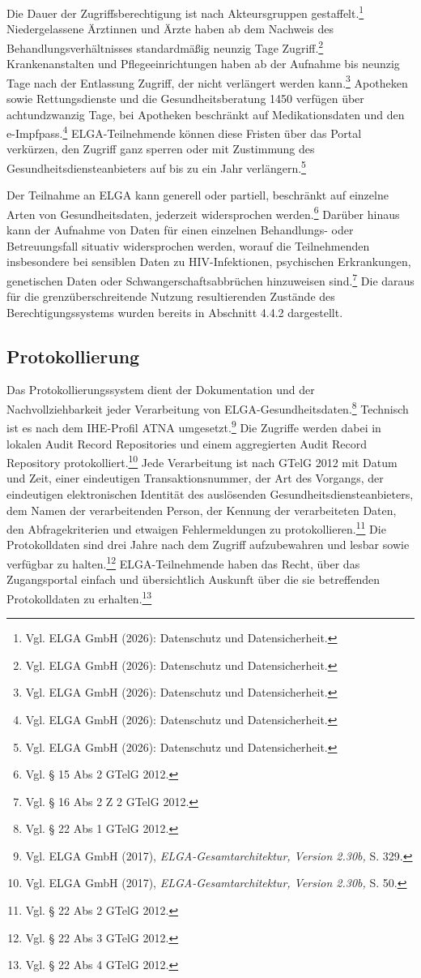 Die Dauer der Zugriffsberechtigung ist nach Akteursgruppen gestaffelt.\footnote{Vgl. ELGA GmbH (2026): Datenschutz und Datensicherheit.} Niedergelassene Ärztinnen und Ärzte haben ab dem Nachweis des Behandlungsverhältnisses standardmäßig neunzig Tage Zugriff.\footnote{Vgl. ELGA GmbH (2026): Datenschutz und Datensicherheit.} Krankenanstalten und Pflegeeinrichtungen haben ab der Aufnahme bis neunzig Tage nach der Entlassung Zugriff, der nicht verlängert werden kann.\footnote{Vgl. ELGA GmbH (2026): Datenschutz und Datensicherheit.} Apotheken sowie Rettungsdienste und die Gesundheitsberatung 1450 verfügen über achtundzwanzig Tage, bei Apotheken beschränkt auf Medikationsdaten und den e-Impfpass.\footnote{Vgl. ELGA GmbH (2026): Datenschutz und Datensicherheit.} ELGA-Teilnehmende können diese Fristen über das Portal verkürzen, den Zugriff ganz sperren oder mit Zustimmung des Gesundheitsdiensteanbieters auf bis zu ein Jahr verlängern.\footnote{Vgl. ELGA GmbH (2026): Datenschutz und Datensicherheit.}

Der Teilnahme an ELGA kann generell oder partiell, beschränkt auf einzelne Arten von Gesundheitsdaten, jederzeit widersprochen werden.\footnote{Vgl. § 15 Abs 2 GTelG 2012.} Darüber hinaus kann der Aufnahme von Daten für einen einzelnen Behandlungs- oder Betreuungsfall situativ widersprochen werden, worauf die Teilnehmenden insbesondere bei sensiblen Daten zu HIV-Infektionen, psychischen Erkrankungen, genetischen Daten oder Schwangerschaftsabbrüchen hinzuweisen sind.\footnote{Vgl. § 16 Abs 2 Z 2 GTelG 2012.} Die daraus für die grenzüberschreitende Nutzung resultierenden Zustände des Berechtigungssystems wurden bereits in Abschnitt 4.4.2 dargestellt.

    \subsection{Protokollierung}
Das Protokollierungssystem dient der Dokumentation und der Nachvollziehbarkeit jeder Verarbeitung von ELGA-Gesundheitsdaten.\footnote{Vgl. § 22 Abs 1 GTelG 2012.} Technisch ist es nach dem IHE-Profil ATNA umgesetzt.\footnote{Vgl.  ELGA GmbH (2017), \textit{ELGA-Gesamtarchitektur, Version 2.30b,} S. 329.} Die Zugriffe werden dabei in lokalen Audit Record Repositories und einem aggregierten Audit Record Repository protokolliert.\footnote{Vgl.  ELGA GmbH (2017), \textit{ELGA-Gesamtarchitektur, Version 2.30b,} S. 50.} Jede Verarbeitung ist nach GTelG 2012 mit Datum und Zeit, einer eindeutigen Transaktionsnummer, der Art des Vorgangs, der eindeutigen elektronischen Identität des auslösenden Gesundheitsdiensteanbieters, dem Namen der verarbeitenden Person, der Kennung der verarbeiteten Daten, den Abfragekriterien und etwaigen Fehlermeldungen zu protokollieren.\footnote{Vgl. § 22 Abs 2 GTelG 2012.} Die Protokolldaten sind drei Jahre nach dem Zugriff aufzubewahren und lesbar sowie verfügbar zu halten.\footnote{Vgl. § 22 Abs 3 GTelG 2012.} ELGA-Teilnehmende haben das Recht, über das Zugangsportal einfach und übersichtlich Auskunft über die sie betreffenden Protokolldaten zu erhalten.\footnote{Vgl. § 22 Abs 4 GTelG 2012.}


